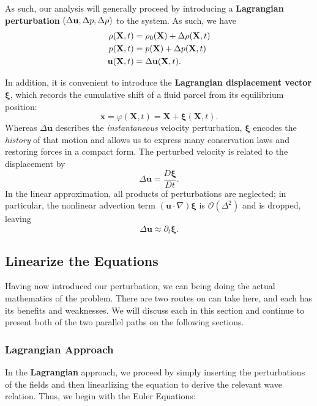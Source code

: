 As such, our analysis will generally proceed by introducing a \textbf{Lagrangian perturbation} $(\Delta {\bf u}, \Delta p,\Delta \rho)$ to the system. As such, we have
\[
\begin{aligned}
    \rho({\bf X},t) &= \rho_0({\bf X}) + \Delta \rho({\bf X},t)\\
    p({\bf X},t) &= p({\bf X}) + \Delta p({\bf X},t)\\
    {\bf u}({\bf X},t) &= \Delta {\bf u}({\bf X},t).
\end{aligned}
\]

In addition, it is convenient to introduce the \textbf{Lagrangian displacement vector} $\boldsymbol{\xi}$, which records the cumulative shift of a fluid parcel from its equilibrium position:
\[
\mathbf{x} = \varphi(\mathbf{X}, t) = \mathbf{X} + \boldsymbol{\xi}(\mathbf{X}, t).
\]
Whereas $\Delta\mathbf{u}$ describes the \emph{instantaneous} velocity perturbation, $\boldsymbol{\xi}$ encodes the \emph{history} of that motion and allows us to express many conservation laws and restoring forces in a compact form. The perturbed velocity is related to the displacement by
\[
\Delta \mathbf{u} = \frac{D\boldsymbol{\xi}}{Dt}.
\]
In the linear approximation, all products of perturbations are neglected; in particular, the nonlinear advection term $(\mathbf{u} \cdot \nabla)\boldsymbol{\xi}$ is $\mathcal{O}(\Delta^2)$ and is dropped, leaving
\[
\Delta \mathbf{u} \approx \partial_t \boldsymbol{\xi}.
\]

\subsection*{Linearize the Equations}

Having now introduced our perturbation, we can being doing the actual mathematics of the problem. There are two routes on can take here, and each has its benefits and weaknesses. We will discuss each in this section and continue to present both of the two parallel paths on the following sections.

\subsubsection*{Lagrangian Approach}

In the \textbf{Lagrangian} approach, we proceed by simply inserting the perturbations of the fields and then linearlizing the equation to derive the relevant wave relation. Thus, we begin with the Euler Equations:

